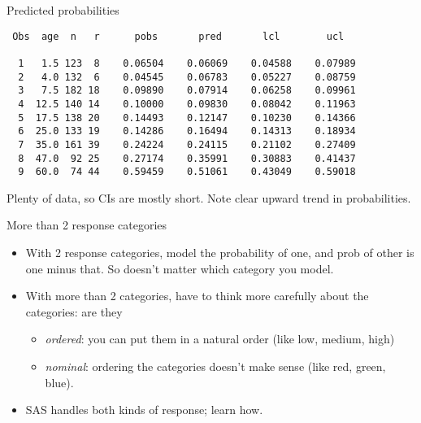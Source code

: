 \documentclass[pdf]{prosper}
\begin{document}
\begin{slide}{Predicted probabilities}

{\scriptsize
\begin{verbatim}
 Obs  age  n   r      pobs       pred       lcl        ucl

  1   1.5 123  8    0.06504    0.06069    0.04588    0.07989
  2   4.0 132  6    0.04545    0.06783    0.05227    0.08759
  3   7.5 182 18    0.09890    0.07914    0.06258    0.09961
  4  12.5 140 14    0.10000    0.09830    0.08042    0.11963
  5  17.5 138 20    0.14493    0.12147    0.10230    0.14366
  6  25.0 133 19    0.14286    0.16494    0.14313    0.18934
  7  35.0 161 39    0.24224    0.24115    0.21102    0.27409
  8  47.0  92 25    0.27174    0.35991    0.30883    0.41437
  9  60.0  74 44    0.59459    0.51061    0.43049    0.59018

\end{verbatim}
}

\vspace{3ex}

Plenty of data, so CIs are mostly short. Note clear upward trend in
probabilities.
  
\end{slide}

\begin{slide}{More than 2 response categories}

  \begin{itemize}
  \item With 2 response categories, model the probability of one, and prob of other is one minus that. So doesn't matter which category you model.
  \item With more than 2 categories, have to think more carefully about the categories: are they
    \begin{itemize}
    \item {\em ordered}: you can put them in a natural order (like low, medium, high)
    \item {\em nominal}: ordering the categories doesn't make sense (like red, green, blue).
    \end{itemize}
  \item SAS handles both kinds of response; learn how.
  \end{itemize}
  
\end{slide}
\end{document}
